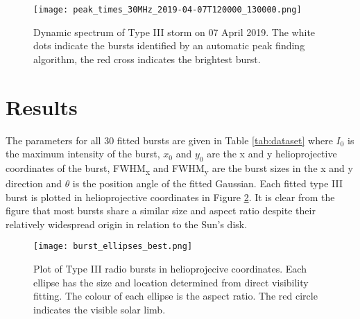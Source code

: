 \begin{figure}[ht]
\centering
\texttt{[image: peak\_times\_30MHz\_2019-04-07T120000\_130000.png]}
\caption[Dynamic spectrum of Type III storm on 07 April 2019.]{Dynamic spectrum of Type III storm on 07 April 2019. The white dots indicate the bursts identified by an automatic peak finding algorithm, the red cross indicates the brightest burst.}
\label{fig:dynamic_spectrum_070419}
\end{figure}

\section{Results}
\label{sec:obsvtheory_results}
The parameters for all 30 fitted bursts are given in Table \ref{tab:dataset} where $I_0$ is the maximum intensity of the burst, $x_0$ and $y_0$ are the x and y  helioprojective coordinates of the burst, FWHM\textsubscript{x} and FWHM\textsubscript{y} are the burst sizes in the x and y direction and $\theta$ is the position angle of the fitted Gaussian. Each fitted type III burst is plotted in helioprojective coordinates in Figure \ref{fig:burst_overlay}. It is clear from the figure that most bursts share a similar size and aspect ratio despite their relatively widespread origin in relation to the Sun's disk.

\begin{figure}[ht]
\centering
\texttt{[image: burst\_ellipses\_best.png]}
\caption[Plot of Type III radio bursts in helioprojecive coordinates.]{Plot of Type III radio bursts in helioprojecive coordinates. Each ellipse has the size and location determined from direct visibility fitting. The colour of each ellipse is the aspect ratio. The red circle indicates the visible solar limb. }
\label{fig:burst_overlay}
\end{figure}

